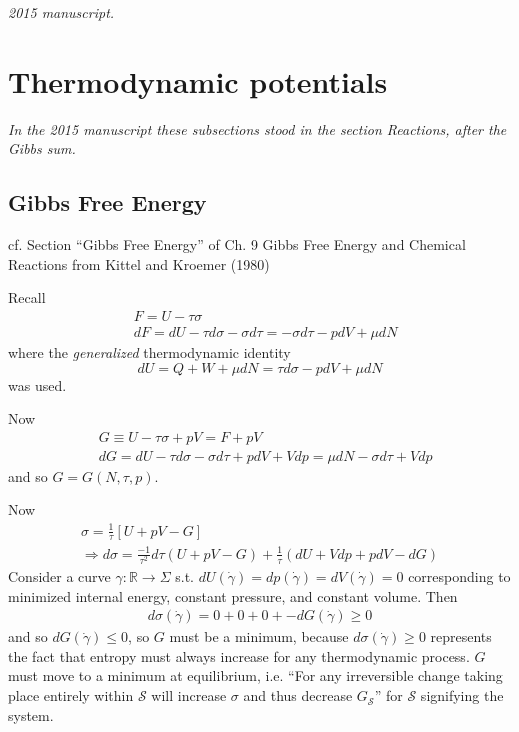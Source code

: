 \noindent\textit{2015 manuscript.}

\section{Thermodynamic potentials}
\noindent\textit{In the 2015 manuscript these subsections stood in the section Reactions, after the Gibbs sum.}

\subsection{Gibbs Free Energy}

cf. Section ``Gibbs Free Energy'' of Ch. 9 Gibbs Free Energy and Chemical Reactions from Kittel and Kroemer (1980) \cite{CKittelHKroemer1980}

Recall 
\[
\begin{aligned}
  & F = U- \tau \sigma \\ 
  & dF = dU - \tau d\sigma - \sigma d\tau = - \sigma d\tau -pdV + \mu dN
\end{aligned}
\]
where the \emph{generalized} thermodynamic identity
\[
dU = Q + W + \mu dN = \tau d\sigma - pdV + \mu dN
\]
was used. 

Now
\[
\begin{aligned}
  & G \equiv U - \tau \sigma + pV = F + pV \\ 
  & dG = dU - \tau d\sigma - \sigma d\tau + pdV + Vdp = \mu dN - \sigma d\tau + Vdp
\end{aligned}
\]
and so $G = G(N,\tau , p)$.  

Now \[
\begin{gathered}
  \sigma = \frac{1}{\tau} [ U +pV - G ] \\
  \Longrightarrow d\sigma = \frac{-1}{\tau^2} d\tau ( U + pV - G) + \frac{1}{\tau} (dU + V dp + pdV - dG)
\end{gathered}
\]
Consider a curve $\gamma : \mathbb{R} \to \Sigma$ s.t. $dU(\dot{\gamma}) = dp(\dot{\gamma}) = dV(\dot{\gamma})=0$ corresponding to minimized internal energy, constant pressure, and constant volume.  Then
\[
\begin{gathered}
  d\sigma(\dot{\gamma}) = 0 + 0 + 0 + -dG(\dot{\gamma}) \geq 0 
\end{gathered}
\]
and so $dG(\dot{\gamma}) \leq 0$, so $G$ must be a minimum, because $d\sigma(\dot{\gamma}) \geq 0$ represents the fact that entropy must always increase for any thermodynamic process.  $G$ must move to a minimum at equilibrium, i.e. ``For any irreversible change taking place entirely within $\mathcal{S}$ will increase $\sigma$ and thus decrease $G_{\mathcal{S}}$'' \cite{CKittelHKroemer1980} for $\mathcal{S}$ signifying the system.  

